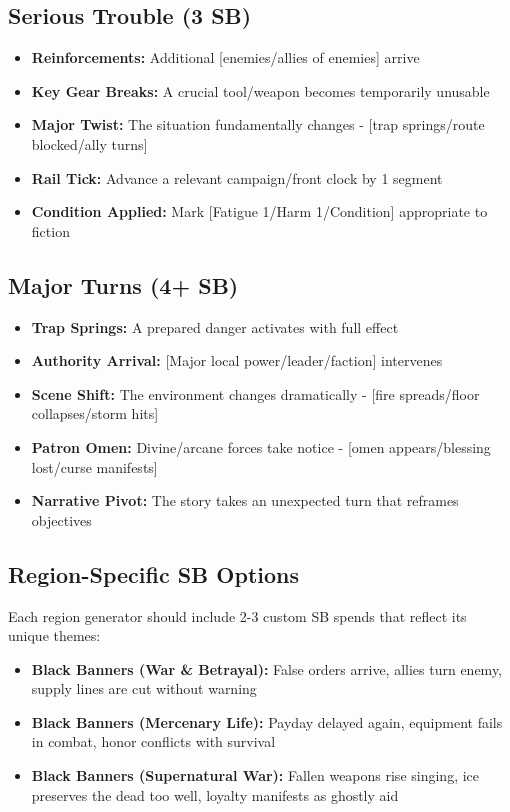 \subsection*{Serious Trouble (3 SB)}
\begin{itemize}
\item \textbf{Reinforcements:} Additional [enemies/allies of enemies] arrive
\item \textbf{Key Gear Breaks:} A crucial tool/weapon becomes temporarily unusable
\item \textbf{Major Twist:} The situation fundamentally changes - [trap springs/route blocked/ally turns]
\item \textbf{Rail Tick:} Advance a relevant campaign/front clock by 1 segment
\item \textbf{Condition Applied:} Mark [Fatigue 1/Harm 1/Condition] appropriate to fiction
\end{itemize}

\subsection*{Major Turns (4+ SB)}
\begin{itemize}
\item \textbf{Trap Springs:} A prepared danger activates with full effect
\item \textbf{Authority Arrival:} [Major local power/leader/faction] intervenes
\item \textbf{Scene Shift:} The environment changes dramatically - [fire spreads/floor collapses/storm hits]
\item \textbf{Patron Omen:} Divine/arcane forces take notice - [omen appears/blessing lost/curse manifests]
\item \textbf{Narrative Pivot:} The story takes an unexpected turn that reframes objectives
\end{itemize}

\subsection*{Region-Specific SB Options}
Each region generator should include 2-3 custom SB spends that reflect its unique themes:

\begin{itemize}
\item \textbf{Black Banners (War \& Betrayal):} False orders arrive, allies turn enemy, supply lines are cut without warning
\item \textbf{Black Banners (Mercenary Life):} Payday delayed again, equipment fails in combat, honor conflicts with survival
\item \textbf{Black Banners (Supernatural War):} Fallen weapons rise singing, ice preserves the dead too well, loyalty manifests as ghostly aid
\end{itemize}
